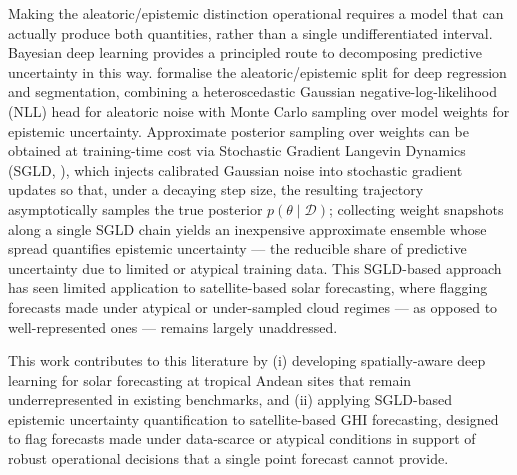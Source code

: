 Making the aleatoric/epistemic distinction operational requires a model that
can actually produce both quantities, rather than a single undifferentiated
interval. Bayesian deep learning provides a principled route to decomposing
predictive uncertainty in this way. \citet{kendall2017} formalise the aleatoric/epistemic split for
deep regression and segmentation, combining a heteroscedastic Gaussian
negative-log-likelihood (NLL) head for aleatoric noise with Monte Carlo
sampling over model weights for epistemic uncertainty. Approximate posterior
sampling over weights can be obtained at training-time cost via Stochastic
Gradient Langevin Dynamics (SGLD, \cite{welling2011}), which injects
calibrated Gaussian noise into stochastic gradient updates so that, under a
decaying step size, the resulting trajectory asymptotically samples the true
posterior $p(\theta \mid \mathcal{D})$; collecting weight snapshots along a
single SGLD chain yields an inexpensive approximate ensemble whose spread
quantifies epistemic uncertainty --- the reducible share of predictive
uncertainty due to limited or atypical training data. This SGLD-based
approach has seen limited application to satellite-based solar forecasting,
where flagging forecasts made under atypical or under-sampled cloud regimes
--- as opposed to well-represented ones --- remains largely unaddressed.

This work contributes to this literature by (i) developing spatially-aware
deep learning for solar forecasting at tropical Andean sites that remain
underrepresented in existing benchmarks, and (ii) applying SGLD-based
epistemic uncertainty quantification to satellite-based GHI forecasting,
designed to flag forecasts made under data-scarce or atypical conditions in
support of robust operational decisions that a single point forecast cannot
provide.
